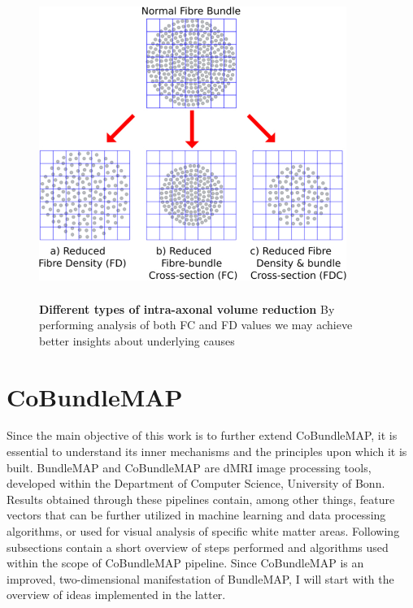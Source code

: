 \documentclass[thesis.tex]{subfiles}
\begin{document}
\begin{figure}
\centering
\includegraphics[width=10cm,height=10cm,keepaspectratio]{thesis_radomskyi/images/difference-fd-fc-fdc.jpg}
\caption{\textbf{Different types of intra-axonal volume reduction} By performing analysis of both FC and FD values we may achieve better insights about underlying causes\cite{fdcAndFBA2017Raffelt}}
\label{fig:difference-fd-fc-fdc}
\end{figure}




\section{CoBundleMAP}
Since the main objective of this work is to further extend CoBundleMAP, it is essential to understand its inner mechanisms and the principles upon which it is built. BundleMAP and CoBundleMAP are dMRI image processing tools, developed within the Department of Computer Science, University of Bonn. Results obtained through these pipelines contain, among other things, feature vectors that can be further utilized in machine learning and data processing algorithms, or used for visual analysis of specific white matter areas. Following subsections contain a short overview of steps performed and algorithms used within the scope of CoBundleMAP pipeline. Since CoBundleMAP is an improved, two-dimensional manifestation of BundleMAP, I will start with the overview of ideas implemented in the latter.
\end{document}
